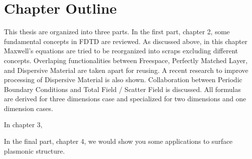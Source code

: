 \section{Chapter Outline}
This thesis are organized into three parts. In the first part, chapter 2, some fundamental concepts in FDTD are
reviewed. As discussed above, in this chapter Maxwell's equations are tried to be reorganized into scraps excluding
different concepts. Overlaping functionalities between Freespace, Perfectly Matched Layer, and Dispersive Material are
taken apart for reusing. A recent research to improve processing of Dispersive Material is also shown. Collaboration
between Periodic Boundary Conditions and Total Field / Scatter Field is discussed. All formulas are derived for three
dimensions case and specialized for two dimensions and one dimension cases.

In chapter 3, 

In the final part, chapter 4, we would show you some applications to surface plasmonic structure.
